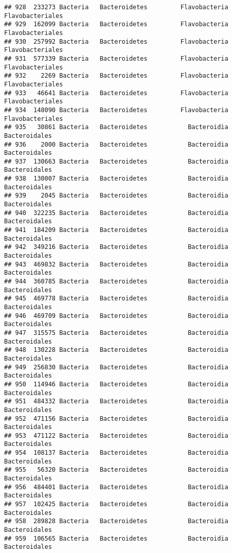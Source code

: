\documentclass[
]{article}
\begin{document}
\begin{verbatim}
## 928  233273 Bacteria   Bacteroidetes         Flavobacteria    Flavobacteriales
## 929  162099 Bacteria   Bacteroidetes         Flavobacteria    Flavobacteriales
## 930  257992 Bacteria   Bacteroidetes         Flavobacteria    Flavobacteriales
## 931  577339 Bacteria   Bacteroidetes         Flavobacteria    Flavobacteriales
## 932    2269 Bacteria   Bacteroidetes         Flavobacteria    Flavobacteriales
## 933   46641 Bacteria   Bacteroidetes         Flavobacteria    Flavobacteriales
## 934  148090 Bacteria   Bacteroidetes         Flavobacteria    Flavobacteriales
## 935   30861 Bacteria   Bacteroidetes           Bacteroidia       Bacteroidales
## 936    2000 Bacteria   Bacteroidetes           Bacteroidia       Bacteroidales
## 937  130663 Bacteria   Bacteroidetes           Bacteroidia       Bacteroidales
## 938  130007 Bacteria   Bacteroidetes           Bacteroidia       Bacteroidales
## 939    2045 Bacteria   Bacteroidetes           Bacteroidia       Bacteroidales
## 940  322235 Bacteria   Bacteroidetes           Bacteroidia       Bacteroidales
## 941  184209 Bacteria   Bacteroidetes           Bacteroidia       Bacteroidales
## 942  349216 Bacteria   Bacteroidetes           Bacteroidia       Bacteroidales
## 943  469832 Bacteria   Bacteroidetes           Bacteroidia       Bacteroidales
## 944  360785 Bacteria   Bacteroidetes           Bacteroidia       Bacteroidales
## 945  469778 Bacteria   Bacteroidetes           Bacteroidia       Bacteroidales
## 946  469709 Bacteria   Bacteroidetes           Bacteroidia       Bacteroidales
## 947  315575 Bacteria   Bacteroidetes           Bacteroidia       Bacteroidales
## 948  130228 Bacteria   Bacteroidetes           Bacteroidia       Bacteroidales
## 949  256830 Bacteria   Bacteroidetes           Bacteroidia       Bacteroidales
## 950  114946 Bacteria   Bacteroidetes           Bacteroidia       Bacteroidales
## 951  484332 Bacteria   Bacteroidetes           Bacteroidia       Bacteroidales
## 952  471156 Bacteria   Bacteroidetes           Bacteroidia       Bacteroidales
## 953  471122 Bacteria   Bacteroidetes           Bacteroidia       Bacteroidales
## 954  108137 Bacteria   Bacteroidetes           Bacteroidia       Bacteroidales
## 955   56320 Bacteria   Bacteroidetes           Bacteroidia       Bacteroidales
## 956  484401 Bacteria   Bacteroidetes           Bacteroidia       Bacteroidales
## 957  102425 Bacteria   Bacteroidetes           Bacteroidia       Bacteroidales
## 958  289828 Bacteria   Bacteroidetes           Bacteroidia       Bacteroidales
## 959  106565 Bacteria   Bacteroidetes           Bacteroidia       Bacteroidales

\end{verbatim}
\end{document}
